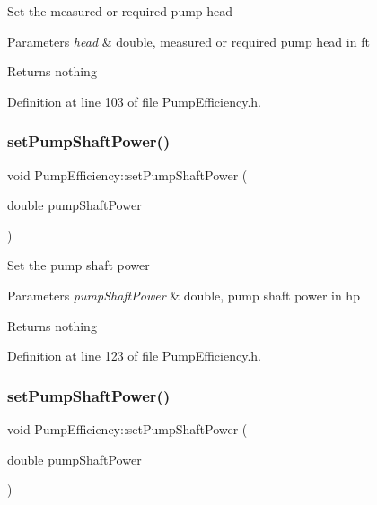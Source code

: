 Set the measured or required pump head


\begin{DoxyParams}{Parameters}
{\em head} & double, measured or required pump head in ft\\
\hline
\end{DoxyParams}
\begin{DoxyReturn}{Returns}
nothing 
\end{DoxyReturn}


Definition at line 103 of file Pump\+Efficiency.\+h.

\mbox{\label{class_pump_efficiency_ad3c2e64a590528b54e3878f9d1f3223a}} 
\subsubsection{\texorpdfstring{set\+Pump\+Shaft\+Power()}{setPumpShaftPower()}\hspace{0.1cm}{\footnotesize\ttfamily [1/3]}}
{\footnotesize\ttfamily void Pump\+Efficiency\+::set\+Pump\+Shaft\+Power (\begin{DoxyParamCaption}\item[{double}]{pump\+Shaft\+Power }\end{DoxyParamCaption})\hspace{0.3cm}{\ttfamily [inline]}}

Set the pump shaft power


\begin{DoxyParams}{Parameters}
{\em pump\+Shaft\+Power} & double, pump shaft power in hp\\
\hline
\end{DoxyParams}
\begin{DoxyReturn}{Returns}
nothing 
\end{DoxyReturn}


Definition at line 123 of file Pump\+Efficiency.\+h.

\mbox{\label{class_pump_efficiency_ad3c2e64a590528b54e3878f9d1f3223a}} 
\subsubsection{\texorpdfstring{set\+Pump\+Shaft\+Power()}{setPumpShaftPower()}\hspace{0.1cm}{\footnotesize\ttfamily [2/3]}}
{\footnotesize\ttfamily void Pump\+Efficiency\+::set\+Pump\+Shaft\+Power (\begin{DoxyParamCaption}\item[{double}]{pump\+Shaft\+Power }\end{DoxyParamCaption})\hspace{0.3cm}{\ttfamily [inline]}}


